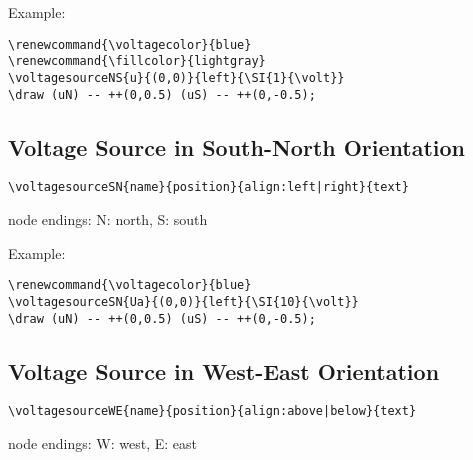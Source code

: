 \documentclass[parskip=full]{scrartcl}
\begin{document}
Example:\\
\begin{minipage}{0.8\textwidth}
\begin{verbatim}
\renewcommand{\voltagecolor}{blue}
\renewcommand{\fillcolor}{lightgray}
\voltagesourceNS{u}{(0,0)}{left}{\SI{1}{\volt}}
\draw (uN) -- ++(0,0.5) (uS) -- ++(0,-0.5);
\end{verbatim}
\end{minipage}
\begin{minipage}{0.19\textwidth}
\end{minipage}

\subsection{Voltage Source in South-North Orientation}

\begin{verbatim}
\voltagesourceSN{name}{position}{align:left|right}{text}
\end{verbatim}
node endings: N: north, S: south

Example:\\
\begin{minipage}{0.8\textwidth}
\begin{verbatim}
\renewcommand{\voltagecolor}{blue}
\voltagesourceSN{Ua}{(0,0)}{left}{\SI{10}{\volt}}
\draw (uN) -- ++(0,0.5) (uS) -- ++(0,-0.5);
\end{verbatim}
\end{minipage}
\begin{minipage}{0.19\textwidth}
\end{minipage}

\subsection{Voltage Source in West-East Orientation}

\begin{verbatim}
\voltagesourceWE{name}{position}{align:above|below}{text}
\end{verbatim}
node endings: W: west, E: east
\end{document}
